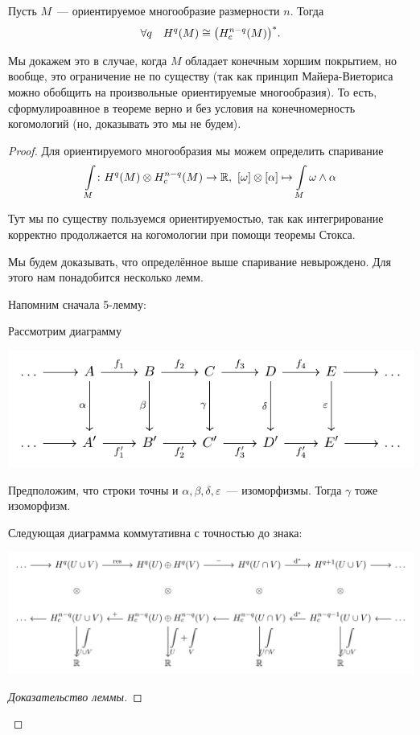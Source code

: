  	 \begin{theorem} 
 	 	Пусть $M$~--- ориентируемое многообразие размерности $n$. Тогда 
 	 	\[
 	 		\forall q \quad H^q(M) \cong \lr*{ H^{n - q}_{c}(M) }^*.
 	 	\]
 	 \end{theorem}
 	 \begin{remark}
 	 	Мы докажем это в случае, когда $M$ обладает конечным хоршим покрытием, но вообще, это ограничение не по существу (так как принцип Майера-Виеториса можно обобщить на произвольные ориентируемые многообразия). То есть, сформулироавнное в теореме верно и без условия на конечномерность когомологий (но, доказывать это мы не будем). 
 	 \end{remark}
 	 \begin{proof}
 	 	Для ориентируемого многообразия мы можем определить спаривание 
 	 	\[
 	 		\int\limits_{M}\colon H^q(M) \otimes H_{c}^{n - q}(M) \to \mathbb{R}, \ [\omega] \otimes [\alpha] \mapsto \int\limits_{M} \omega \wedge \alpha  
 	 	\]

 	 	Тут мы по существу пользуемся ориентируемостью, так как интегрирование корректно продолжается на когомологии при помощи теоремы Стокса. 

 	 	Мы будем доказывать, что определённое выше спаривание невырождено. Для этого нам понадобится несколько лемм. 

 	 	Напомним сначала 5-лемму: 

 	 	\begin{lemma}[5-лемма] 
 	 		Рассмотрим диаграмму 
 	 		\begin{center}
 	 			\includegraphics{lectures/7/pictures/cd_18.pdf}
 	 		\end{center}

 	 		Предположим, что строки точны и $\alpha, \beta, \delta, \varepsilon$~--- изоморфизмы. Тогда $\gamma$ тоже изоморфизм. 
 	 	\end{lemma}

 	 	\begin{lemma} 
 	 		Следующая диаграмма коммутативна с точностью до знака: 

 			\begin{center}
 				\includegraphics{lectures/7/pictures/cd_19.pdf}
 			\end{center}
 	 	\end{lemma}
 	 	\begin{proof}[Доказательство леммы]


\end{proof}
\end{proof}
